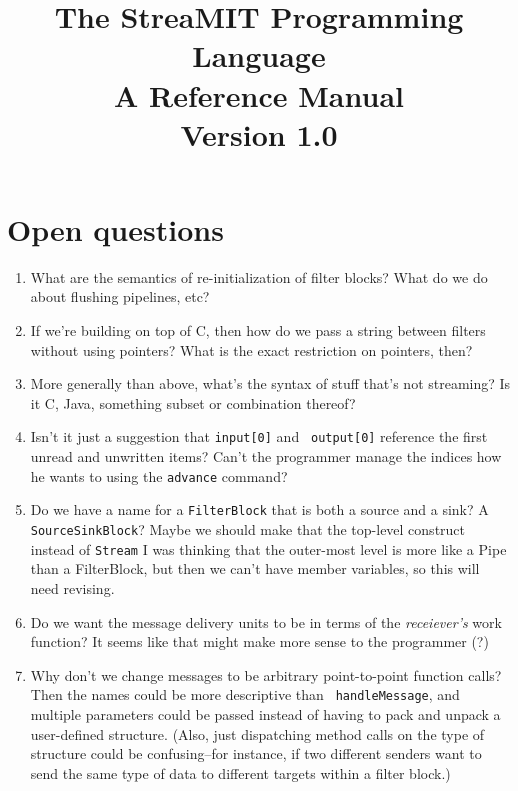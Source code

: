 \documentclass[draft]{article}
\title{The StreaMIT Programming Language \\ A Reference Manual \\ Version 1.0}
\begin{document}
\maketitle

\section{Open questions}

\begin{enumerate}

\item What are the semantics of re-initialization of filter blocks?
What do we do about flushing pipelines, etc?

\item If we're building on top of C, then how do we pass a string
between filters without using pointers?  What is the exact restriction
on pointers, then?

\item More generally than above, what's the syntax of stuff that's not
streaming?  Is it C, Java, something subset or combination thereof?

\item Isn't it just a suggestion that {\tt input[0]} and {\tt
output[0]} reference the first unread and unwritten items?  Can't the
programmer manage the indices how he wants to using the {\tt advance}
command?

\item Do we have a name for a {\tt FilterBlock} that is both a source
and a sink?  A {\tt SourceSinkBlock}?  Maybe we should make that the
top-level construct instead of {\tt Stream} I was thinking that the
outer-most level is more like a Pipe than a FilterBlock, but then we
can't have member variables, so this will need revising.

\item Do we want the message delivery units to be in terms of the {\it
receiever's} work function?  It seems like that might make more sense
to the programmer (?)

\item Why don't we change messages to be arbitrary point-to-point
function calls?  Then the names could be more descriptive than {\tt
handleMessage}, and multiple parameters could be passed instead of
having to pack and unpack a user-defined structure.  (Also, just
dispatching method calls on the type of structure could be
confusing--for instance, if two different senders want to send the
same type of data to different targets within a filter block.)

\end{enumerate}
\end{document}
